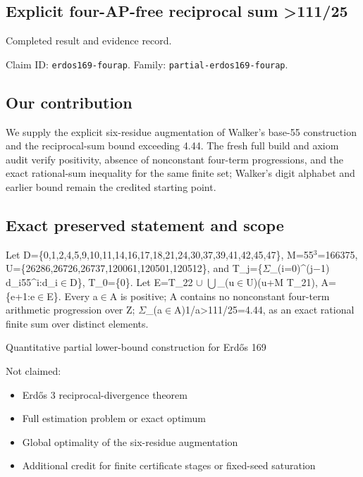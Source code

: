 \documentclass[11pt,a4paper]{article}
\begin{document}
\subsection{Explicit four-AP-free reciprocal sum >111/25}
Completed result and evidence record.

Claim ID: \texttt{erdos169-fourap}. Family: \texttt{partial-erdos169-fourap}.

\subsection{Our contribution}
We supply the explicit six-residue augmentation of Walker's base-55 construction and the reciprocal-sum bound exceeding 4.44. The fresh full build and axiom audit verify positivity, absence of nonconstant four-term progressions, and the exact rational-sum inequality for the same finite set; Walker's digit alphabet and earlier bound remain the credited starting point.

\subsection{Exact preserved statement and scope}
Let D=\{0,1,2,4,5,9,10,11,14,16,17,18,21,24,30,37,39,41,42,45,47\}, M=55\ensuremath{^3}=166375, U=\{26286,26726,26737,120061,120501,120512\}, and T\_j=\{\ensuremath{\Sigma}\_(i=0)\textasciicircum{}(j\ensuremath{-}1) d\_i55\textasciicircum{}i:d\_i\ensuremath{\in}D\}, T\_0=\{0\}. Let E=T\_22 \ensuremath{\cup} \ensuremath{\bigcup}\_(u\ensuremath{\in}U)(u+M T\_21), A=\{e+1:e\ensuremath{\in}E\}. Every a\ensuremath{\in}A is positive; A contains no nonconstant four-term arithmetic progression over Z; \ensuremath{\Sigma}\_(a\ensuremath{\in}A)1/a>111/25=4.44, as an exact rational finite sum over distinct elements.

Quantitative partial lower-bound construction for Erdős 169

Not claimed:

\begin{itemize}
\item Erdős 3 reciprocal-divergence theorem
\end{itemize}
\begin{itemize}
\item Full estimation problem or exact optimum
\end{itemize}
\begin{itemize}
\item Global optimality of the six-residue augmentation
\end{itemize}
\begin{itemize}
\item Additional credit for finite certificate stages or fixed-seed saturation
\end{itemize}
\end{document}
